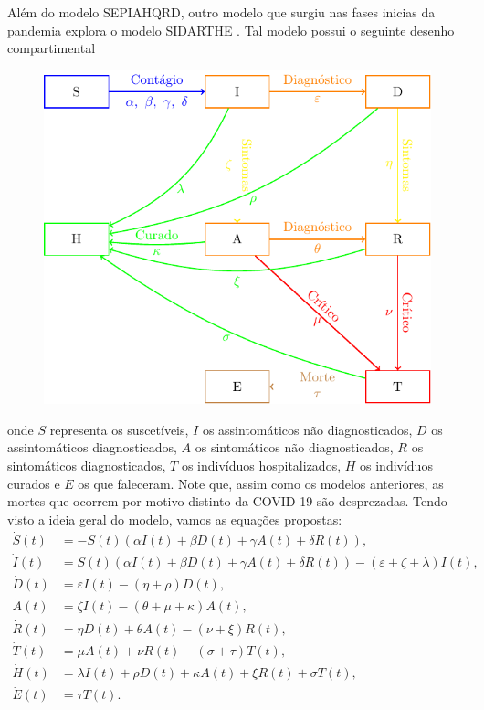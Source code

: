 \documentclass{article}
\begin{document}
Além do modelo SEPIAHQRD, outro modelo que surgiu nas fases inicias da pandemia explora o modelo SIDARTHE \cite{JOUR}. Tal modelo possui o seguinte desenho compartimental
\begin{figure}[H]
    \centering
    \includegraphics[page = 1]{Tikz - PDF/Tikz2.pdf}
\end{figure}

\noindent onde $S$ representa os suscetíveis, $I$ os assintomáticos não diagnosticados, $D$ os assintomáticos diagnosticados, $A$ os sintomáticos não diagnosticados, $R$ os sintomáticos diagnosticados, $T$ os indivíduos hospitalizados, $H$ os indivíduos curados e $E$ os que faleceram. Note que, assim como os modelos anteriores, as mortes que ocorrem por motivo distinto da COVID-19 são desprezadas. Tendo visto a ideia geral do modelo, vamos as equações propostas:
\begin{equation*}
    \begin{split}
        \dot{S}(t) & = -S(t)(\alpha I(t) + \beta D(t) + \gamma A(t) + \delta R(t)),\\
        \dot{I}(t) & = S(t)(\alpha I(t) + \beta D(t) + \gamma A(t) + \delta R(t)) - (\varepsilon + \zeta + \lambda)I(t), \\
        \dot{D}(t) & = \varepsilon I(t) - (\eta + \rho)D(t), \\
        \dot{A}(t) & = \zeta I(t) - (\theta + \mu + \kappa)A(t), \\
        \dot{R}(t) & = \eta D(t) + \theta A(t) - (\nu + \xi)R(t), \\
        \dot{T}(t) & = \mu A(t) + \nu R(t) - (\sigma + \tau)T(t), \\
        \dot{H}(t) & = \lambda I(t) + \rho D(t) + \kappa A(t) + \xi R(t) + \sigma T(t), \\
        \dot{E}(t) & = \tau T(t).
    \end{split}
\end{equation*}
\end{document}
